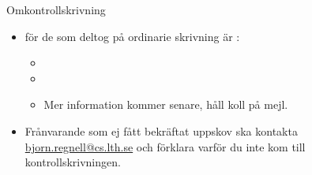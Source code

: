 
\begin{Slide}{Omkontrollskrivning}
  \begin{itemize}
    \item {} för de som  deltog på ordinarie skrivning är :
    \begin{itemize}
      \item \Emph{\OmkontrollDatum}
      \item {} 
      \item Mer information kommer senare, håll koll på mejl.
    \end{itemize}
    \item Frånvarande som ej fått bekräftat uppskov ska  kontakta \url{bjorn.regnell@cs.lth.se} och förklara varför du inte kom till kontrollskrivningen.
  \end{itemize}
\end{Slide}

    
